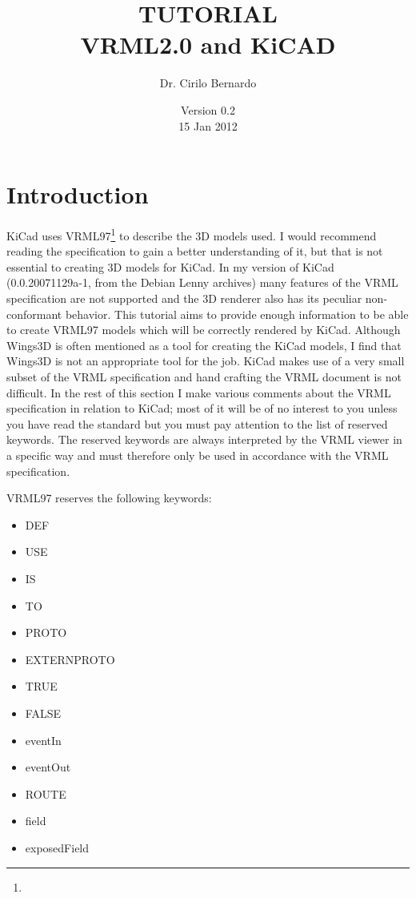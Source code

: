 \documentclass[a4paper]{article}
\title{TUTORIAL\\
VRML2.0 and KiCAD}
\date{Version 0.2\\
15 Jan 2012}
\author{Dr. Cirilo Bernardo}
\makeatletter
\def\maketitle{%
  \null
  \thispagestyle{empty}%
  \vfill
  \begin{center}\leavevmode
    \normalfont
{\LARGE \@title\par}%
    \vskip 1cm
{\Large \@author\par}%
    \vskip 1cm
{\Large \@date\par}%
  \end{center}%
  \vfill
  \null
  \cleardoublepage
}
\makeatother
\begin{document}
\maketitle

%
%

\setcounter{page}{1}

\section{Introduction}
KiCad uses VRML97\footnote{}
to describe the 3D models used.
I would recommend reading the specification to gain a better understanding of it, but that is not essential to creating 3D models for KiCad.  In my
version of KiCad (0.0.20071129a-1, from the Debian Lenny archives) many features of the VRML specification are not supported and the 3D renderer also
has its peculiar non-conformant behavior.  This tutorial aims to provide enough information to be able to create VRML97 models which will be
correctly rendered by KiCad. Although Wings3D is often mentioned as a tool for creating the KiCad models, I find that Wings3D is not an appropriate
tool for the job.  KiCad makes use of a very small subset of the VRML specification and hand crafting the VRML document is not difficult.
In the rest of this section I make various comments about the VRML specification in relation to KiCad; most of it will be of no interest to
you unless you have read the standard but you must pay attention to the list of reserved keywords. The reserved keywords are always interpreted by the
VRML viewer in a specific way and must therefore only be used in accordance with the VRML specification.

VRML97 reserves the following keywords:

\begin{itemize}
\item {DEF}
\item {USE}
\item {IS}
\item {TO}
\item {PROTO}
\item {EXTERNPROTO}
\item {TRUE}
\item {FALSE}
\item {eventIn}
\item {eventOut}
\item {ROUTE}
\item {field}
\item {exposedField}
\end{itemize}
\end{document}
